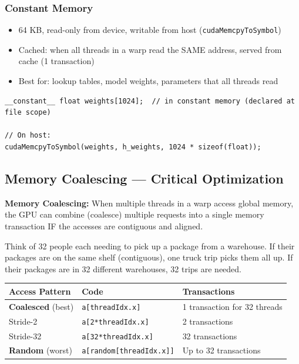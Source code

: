 \documentclass[11pt,a4paper]{article}
\newcommand{\code}[1]{\texttt{\small\colorbox{codebg}{\color{codekw}#1}}}
\newcommand{\term}[1]{\textbf{\color{darkblue}#1}}
\begin{document}
\subsubsection{Constant Memory}
\begin{itemize}[noitemsep]
  \item 64 KB, read-only from device, writable from host (\code{cudaMemcpyToSymbol})
  \item Cached: when all threads in a warp read the SAME address, served from cache (1 transaction)
  \item Best for: lookup tables, model weights, parameters that all threads read
\end{itemize}

\begin{lstlisting}
__constant__ float weights[1024];  // in constant memory (declared at file scope)

// On host:
cudaMemcpyToSymbol(weights, h_weights, 1024 * sizeof(float));
\end{lstlisting}

\subsection{Memory Coalescing --- Critical Optimization}

\begin{mydef}
\textbf{Memory Coalescing:} When multiple threads in a warp access global memory, the GPU can combine (coalesce) multiple requests into a single memory transaction IF the accesses are contiguous and aligned.
\end{mydef}

\begin{analogy}
Think of 32 people each needing to pick up a package from a warehouse. If their packages are on the same shelf (contiguous), one truck trip picks them all up. If their packages are in 32 different warehouses, 32 trips are needed.
\end{analogy}

\begin{center}
\begin{tabular}{L{5cm} L{4.5cm} L{4cm}}
\toprule
\textbf{Access Pattern} & \textbf{Code} & \textbf{Transactions} \\
\midrule
\term{Coalesced} (best) & \code{a[threadIdx.x]} & 1 transaction for 32 threads \\
Stride-2 & \code{a[2*threadIdx.x]} & 2 transactions \\
Stride-32 & \code{a[32*threadIdx.x]} & 32 transactions \\
\term{Random} (worst) & \code{a[random[threadIdx.x]]} & Up to 32 transactions \\
\bottomrule
\end{tabular}
\end{center}
\end{document}
